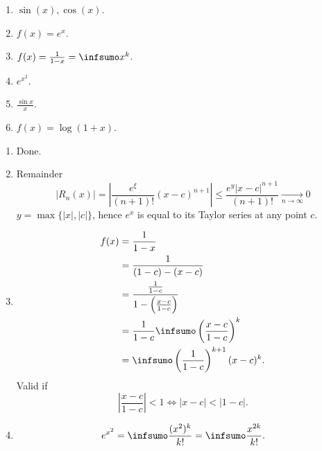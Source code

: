 \documentclass[10pt, a4paper]{article}
\begin{document}
\begin{example}
    \begin{enumerate}[label = (\roman*)]
        \item $\sin(x), \cos(x)$.

        \item $f(x) = e ^ x$.

        \item $f(x) = \frac{1}{1 - x} = \infsumo x ^ k$.

        \item $e ^ {x ^ 2}$.

        \item $\frac{\sin{x}}{x}$.

        \item $f(x) = \log(1 + x)$.
    \end{enumerate}

    \begin{solution}
        \begin{enumerate}[label = (\roman*)]
            \item Done.

            \item Remainder
            \[
            |R_n(x)| = \left|\frac{e ^ {\xi}}{(n + 1)!}(x - c) ^ {n + 1}\right| \leq \frac{e ^ {y}|x - c| ^ {n + 1}}{(n + 1)!} \xrightarrow[n \to \infty]{} 0
            \]
            $y = \max{\{|x|, |c|\}}$,
            hence $e ^ x$ is equal to its Taylor series at any point $c$.

            \item
            \begin{align*}
                f(x) &= \frac{1}{1 - x} \\
                &= \frac{1}{(1 - c) - (x - c)} \\
                &= \frac{\frac{1}{1 - c}}{1 - \left(\frac{x - c}{1 - c}\right)} \\
                &= \frac{1}{1 - c}\infsumo\left(\frac{x - c}{1 - c}\right) ^ k \\
                &= \infsumo\left(\frac{1}{1 - c}\right) ^ {k + 1}(x - c) ^ k.
            \end{align*}
            Valid if
            \[
            \left|\frac{x - c}{1 - c}\right| < 1 \iff |x - c| < |1 - c|.
            \]

            \item
            \[
            e ^ {x ^ 2} = \infsumo\frac{(x ^ 2) ^ k}{k!} = \infsumo\frac{x ^ {2k}}{k!}.
            \]


\end{enumerate}
\end{solution}
\end{example}
\end{document}
